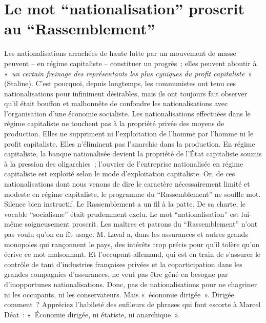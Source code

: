 \documentclass[french,twoside]{book} %
\begin{document}
\section[{Le mot “nationalisation” proscrit au “Rassemblement”}]{Le mot “nationalisation” proscrit au “Rassemblement”}
\noindent Les nationalisations arrachées de haute lutte par un mouvement de masse peuvent – en régime capitaliste – constituer un progrès ; elles peuvent aboutir à « \emph{un certain freinage des représentants les plus cyniques du profit capitaliste} » (Staline). C’est pourquoi, depuis longtemps, les communistes ont tenu ces nationalisations pour infiniment désirables, mais ils ont toujours fait observer qu’il était bouffon et malhonnête de confondre les nationalisations avec l’organisation d’une économie socialiste. Les nationalisations effectuées dans le régime capitaliste ne touchent pas à la propriété privée des moyens de production. Elles ne suppriment ni l’exploitation de l’homme par l’homme ni le profit capitaliste. Elles n’éliminent pas l’anarchie dans la production. En régime capitaliste, la banque nationalisée devient la propriété de l’État capitaliste soumis à la pression des oligarchies ; l’ouvrier de l’entreprise nationalisée en régime capitaliste est exploité selon le mode d’exploitation capitaliste. Or, de ces nationalisations dont nous venons de dire le caractère nécessairement limité et modeste en régime capitaliste, le programme du “Rassemblement” ne souffle mot. Silence bien instructif. Le Rassemblement a un fil à la patte. De sa charte, le vocable “socialisme” était prudemment exclu. Le mot “nationalisation” est lui-même soigneusement proscrit. Les maîtres et patrons du “Rassemblement” n’ont pas voulu qu’on en fît usage. M. Laval a, dans les assurances et autres grands monopoles qui rançonnent le pays, des intérêts trop précis pour qu’il tolère qu’on écrive ce mot malsonnant. Et l’occupant allemand, qui est en train de s’assurer le contrôle de tant d’industries françaises privées et la coparticipation dans les grandes compagnies d’assurances, ne veut pas être gêné en besogne par d’inopportunes nationalisations. Donc, pas de nationalisations pour ne chagriner ni les occupants, ni les conservateurs. Mais « économie dirigée ». Dirigée comment ? Appréciez l’habileté des enfileurs de phrases qui font escorte à Marcel Déat : « Économie dirigée, ni étatiste, ni anarchique ».
\end{document}
